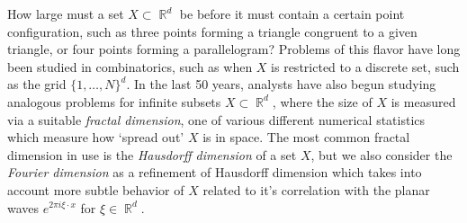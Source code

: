 \documentclass[11pt]{article}
\DeclareMathOperator{\RR}{\mathbb{R}}
\begin{document}
How large must a set $X \subset \RR^d$ be before it must contain a certain point configuration, such as three points forming a triangle congruent to a given triangle, or four points forming a parallelogram? Problems of this flavor have long been studied in combinatorics, such as when $X$ is restricted to a discrete set, such as the grid $\{ 1, \dots, N \}^d$. In the last 50 years, analysts have also begun studying analogous problems for infinite subsets $X \subset \RR^d$, where the size of $X$ is measured via a suitable \emph{fractal dimension}, one of various different numerical statistics which measure how `spread out' $X$ is in space. The most common fractal dimension in use is the \emph{Hausdorff dimension} of a set $X$, but we also consider the \emph{Fourier dimension} as a refinement of Hausdorff dimension which takes into account more subtle behavior of $X$ related to it's correlation with the planar waves $e^{2 \pi i \xi \cdot x}$ for $\xi \in \RR^d$. 
\end{document}
